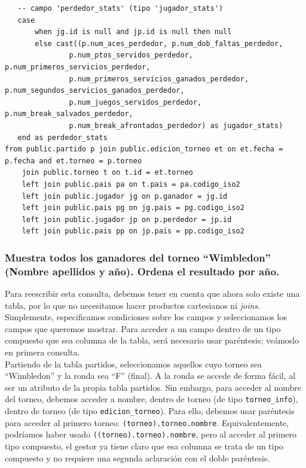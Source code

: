 \begin{verbatim}
   -- campo 'perdedor_stats' (tipo 'jugador_stats')
   case
       when jg.id is null and jp.id is null then null
       else cast((p.num_aces_perdedor, p.num_dob_faltas_perdedor,
           	   p.num_ptos_servidos_perdedor, p.num_primeros_servicios_perdedor,
           	   p.num_primeros_servicios_ganados_perdedor, p.num_segundos_servicios_ganados_perdedor,
           	   p.num_juegos_servidos_perdedor, p.num_break_salvados_perdedor,
           	   p.num_break_afrontados_perdedor) as jugador_stats)
   end as perdedor_stats
from public.partido p join public.edicion_torneo et on et.fecha = p.fecha and et.torneo = p.torneo 
	join public.torneo t on t.id = et.torneo
	left join public.pais pa on t.pais = pa.codigo_iso2
	left join public.jugador jg on p.ganador = jg.id
	left join public.pais pg on jg.pais = pg.codigo_iso2
	left join public.jugador jp on p.perdedor = jp.id
	left join public.pais pp on jp.pais = pp.codigo_iso2
\end{verbatim}



\subsubsection{Muestra todos los ganadores del torneo ``Wimbledon'' (Nombre apellidos y año). Ordena el resultado por año.}

Para reescribir esta consulta, debemos tener en cuenta que ahora solo existe una tabla, por lo que no necesitamos hacer productos cartesianos ni \textit{joins}. Simplemente, especificamos condiciones sobre los campos y seleccionamos los campos que queremos mostrar. Para acceder a un campo dentro de un tipo compuesto que sea columna de la tabla, será necesario usar paréntesis; veámoslo en primera consulta. \\

Partiendo de la tabla partidos, seleccionamos aquellos cuyo torneo sea ``Wimbledon'' y la ronda sea ``F'' (final). A la ronda se accede de forma fácil, al ser un atributo de la propia tabla partidos. Sin embargo, para acceder al nombre del torneo, debemos acceder a nombre, dentro de torneo (de tipo \texttt{torneo\_info}), dentro de torneo (de tipo \texttt{edicion\_torneo}). Para ello, debemos usar paréntesis para acceder al primero torneo: \texttt{(torneo).torneo.nombre}. Equivalentemente, podríamos haber usado \texttt{((torneo).torneo).nombre}, pero al acceder al primero tipo compuesto, el gestor ya tiene claro que esa columna se trata de un tipo compuesto y no requiere una segunda aclaración con el doble paréntesis. \\

